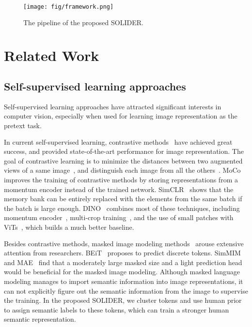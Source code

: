 \documentclass[10pt,twocolumn,letterpaper]{article}
\begin{document}
\begin{figure*}[!t]
\centering
\texttt{[image: fig/framework.png]}
\vspace{-1.1cm}
\caption{The pipeline of the proposed SOLIDER.}
\label{fig:framework}
\vspace{-0.4cm}
\end{figure*}

\section{Related Work}

\subsection{Self-supervised learning approaches}

Self-supervised learning approaches have attracted significant interests in computer vision, especially when used for learning image representation as the pretext task.

In current self-supervised learning, contrastive methods~\cite{moco,mocov2,swav,simclr,ibot,dino} have achieved great success, and provided state-of-the-art performance for image representation. The goal of contrastive learning is to minimize the distances between two augmented views of a same image~\cite{swav,simclr}, and distinguish each image from all the others~\cite{moco,mocov2,dino}. 
MoCo~\cite{moco,mocov2} improves the training of contrastive methods by storing representations from a momentum encoder instead of the trained
network. SimCLR~\cite{simclr} shows that the memory bank can be entirely replaced with the elements from the same batch if the batch is large enough. DINO~\cite{dino} combines most of these techniques, including momentum encoder~\cite{moco}, multi-crop training~\cite{swav}, and the use of small patches with ViTs~\cite{vit}, which builds a much better baseline.



Besides contrastive methods, masked image modeling methods~\cite{mae,simmim,beit} arouse extensive attention from researchers. 
BEiT~\cite{beit} proposes to predict discrete tokens. SimMIM~\cite{simmim} and MAE~\cite{mae}
find that a moderately large masked size and a light prediction head would be beneficial for the masked image modeling. 
Although masked language modeling manages to import semantic information into image representations, it can not explicitly figure out the semantic information from the image to supervise the training. In the proposed SOLIDER, we cluster tokens and use human prior to assign semantic labels to these tokens, which can train a stronger human semantic representation.
\end{document}
